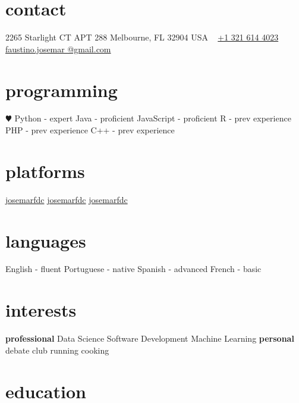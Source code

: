 \documentclass[]{cv-style}          %
\begin{document}
\lastupdated

\vspace{-0.2cm}
\begin{aside}
%
\vspace{-0.1cm}
\section{contact}
2265 Starlight CT
APT 288
Melbourne, FL 32904
USA
~
\href{tel:+13216144023}{+1 321 614 4023}
~
\href{mailto:faustino.josemar@gmail.com}{{faustino.josemar
@gmail.com}}
%
\section{programming}
{\color{red} $\varheartsuit$}
Python - expert
Java - proficient
JavaScript - proficient
R - prev experience
PHP - prev experience
C++ - prev experience
%
%
\section{platforms}
\href{https://github.com/josemarfdc}{{\huge \faGithub}{ josemarfdc}}
\href{https://www.linkedin.com/in/josemarfdc}{{\huge \faLinkedin}{ josemarfdc}}
\href{https://twitter.com/josemarfdc}{{\huge \faTwitter}{ josemarfdc}}
\section{languages}
English - fluent
Portuguese - native
Spanish - advanced
French - basic
%
\section{interests}
\vspace{0.5cm}
\textbf{professional}
Data Science
Software Development
Machine Learning
\vspace{0.5cm}
\textbf{personal}
debate club
running
cooking
%
\end{aside}

\section{education}
\end{document}

